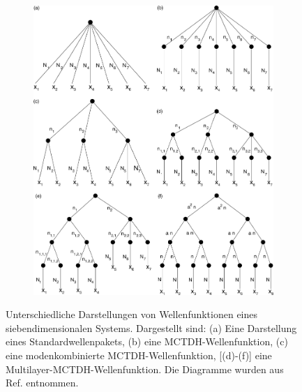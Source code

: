 \begin{figure}
    \centering
    \captionsetup[subfigure]{position=top, labelfont=bf,textfont=normalfont,singlelinecheck=off,justification=raggedright,labelformat=empty}
    \begin{subfigure}{\textwidth}
        \caption{}\label{fig:a}
    \end{subfigure}
    \begin{subfigure}{\textwidth}
        \caption{}\label{fig:b}
    \end{subfigure}
    \begin{subfigure}{\textwidth}
        \caption{}\label{fig:c}
    \end{subfigure}
    \begin{subfigure}{\textwidth}
        \caption{}\label{fig:d}
    \end{subfigure}
    \begin{subfigure}{\textwidth}
        \caption{}\label{fig:e}
    \end{subfigure}
    \begin{subfigure}{\textwidth}
        \caption{}\label{fig:f}
        \vspace*{-4cm}\includegraphics[width=\textwidth]{figures/treeDiagramms}
    \end{subfigure}
    \caption{Unterschiedliche Darstellungen von Wellenfunktionen eines siebendimensionalen Systems. Dargestellt sind: (a) Eine Darstellung eines Standardwellenpakets,
      (b) eine MCTDH-Wellenfunktion, (c) eine modenkombinierte MCTDH-Wellenfunktion, [(d)-(f)] eine Multilayer-MCTDH-Wellenfunktion. Die Diagramme wurden aus Ref.\cite{Mreview2} 
      entnommen.} \label{fig:tree}
\end{figure}

